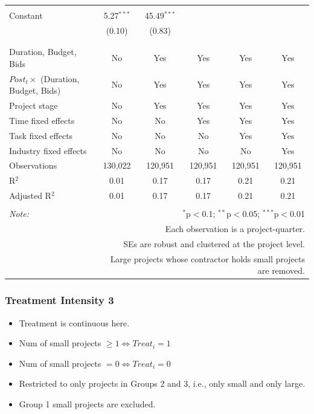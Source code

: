 \documentclass[
]{article}
\providecommand{\tightlist}{%
  \setlength{\itemsep}{0pt}\setlength{\parskip}{0pt}}
\begin{document}
\begin{table}[H]
\begin{tabular}{@{\extracolsep{-2pt}}lccccc}
  & & & & & \\ 
 Constant & 5.27$^{***}$ & 45.49$^{***}$ &  &  &  \\ 
  & (0.10) & (0.83) &  &  &  \\ 
  & & & & & \\ 
\hline \\[-1.8ex] 
Duration, Budget, Bids & No & Yes & Yes & Yes & Yes \\ 
$Post_t \times $  (Duration, Budget, Bids) & No & Yes & Yes & Yes & Yes \\ 
Project stage & No & Yes & Yes & Yes & Yes \\ 
Time fixed effects & No & No & Yes & Yes & Yes \\ 
Task fixed effects & No & No & No & Yes & Yes \\ 
Industry fixed effects & No & No & No & No & Yes \\ 
Observations & 130,022 & 120,951 & 120,951 & 120,951 & 120,951 \\ 
R$^{2}$ & 0.01 & 0.17 & 0.17 & 0.21 & 0.21 \\ 
Adjusted R$^{2}$ & 0.01 & 0.17 & 0.17 & 0.21 & 0.21 \\ 
\hline 
\hline \\[-1.8ex] 
\textit{Note:}  & \multicolumn{5}{r}{$^{*}$p$<$0.1; $^{**}$p$<$0.05; $^{***}$p$<$0.01} \\ 
 & \multicolumn{5}{r}{Each observation is a project-quarter.} \\ 
 & \multicolumn{5}{r}{SEs are robust and clustered at the project level.} \\ 
 & \multicolumn{5}{r}{Large projects whose contractor holds small projects are removed.} \\ 
\end{tabular} 
\end{table}

\hypertarget{treatment-intensity-3}{%
\subsubsection{Treatment Intensity 3}\label{treatment-intensity-3}}

\begin{itemize}
\tightlist
\item
  Treatment is continuous here.
\item
  Num of small projects \(\geq 1 \iff Treat_i = 1\)
\item
  Num of small projects \(=0 \iff Treat_i = 0\)
\item
  Restricted to only projects in Groups 2 and 3, i.e., only small and
  only large.
\item
  Group 1 small projects are excluded.
\end{itemize}
\end{document}
